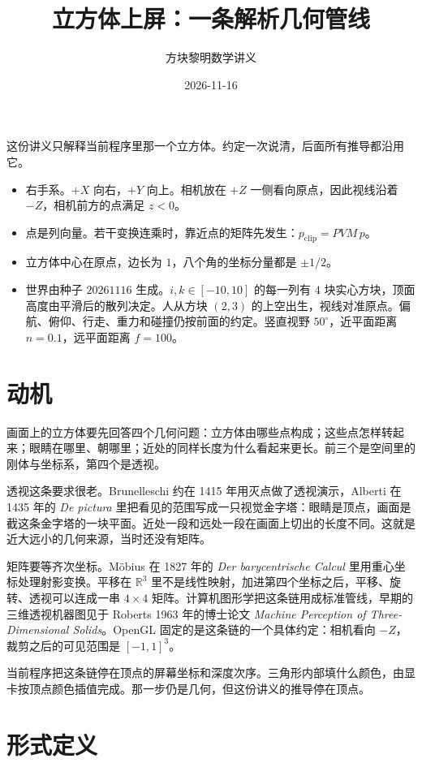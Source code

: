 \documentclass[12pt,a4paper]{article}
\title{立方体上屏：一条解析几何管线}
\author{方块黎明数学讲义}
\date{2026-11-16}
\theoremstyle{definition}
\theoremstyle{plain}
\theoremstyle{remark}
\begin{document}
\maketitle
\tableofcontents
\bigskip

\noindent
这份讲义只解释当前程序里那一个立方体。约定一次说清，后面所有推导都沿用它。

\begin{itemize}
\item 右手系。$+X$ 向右，$+Y$ 向上。相机放在 $+Z$ 一侧看向原点，因此视线沿着 $-Z$，相机前方的点满足 $z<0$。
\item 点是列向量。若干变换连乘时，靠近点的矩阵先发生：$p_{\mathrm{clip}}=PVM\,p$。
\item 立方体中心在原点，边长为 $1$，八个角的坐标分量都是 $\pm 1/2$。
\item 世界由种子 $20261116$ 生成。$i,k\in[-10,10]$ 的每一列有 $4$ 块实心方块，顶面高度由平滑后的散列决定。人从方块 $(2,3)$ 的上空出生，视线对准原点。偏航、俯仰、行走、重力和碰撞仍按前面的约定。竖直视野 $50^\circ$，近平面距离 $n=0.1$，远平面距离 $f=100$。
\end{itemize}

\section{动机}

画面上的立方体要先回答四个几何问题：立方体由哪些点构成；这些点怎样转起来；眼睛在哪里、朝哪里；近处的同样长度为什么看起来更长。前三个是空间里的刚体与坐标系，第四个是透视。

透视这条要求很老。Brunelleschi 约在 1415 年用灭点做了透视演示，Alberti 在 1435 年的 \emph{De pictura} 里把看见的范围写成一只视觉金字塔：眼睛是顶点，画面是截这条金字塔的一块平面。近处一段和远处一段在画面上切出的长度不同。这就是近大远小的几何来源，当时还没有矩阵。

矩阵要等齐次坐标。M\"obius 在 1827 年的 \emph{Der barycentrische Calcul} 里用重心坐标处理射影变换。平移在 $\mathbb{R}^3$ 里不是线性映射，加进第四个坐标之后，平移、旋转、透视可以连成一串 $4\times 4$ 矩阵。计算机图形学把这条链用成标准管线，早期的三维透视机器图见于 Roberts 1963 年的博士论文 \emph{Machine Perception of Three-Dimensional Solids}。OpenGL 固定的是这条链的一个具体约定：相机看向 $-Z$，裁剪之后的可见范围是 $[-1,1]^3$。

当前程序把这条链停在顶点的屏幕坐标和深度次序。三角形内部填什么颜色，由显卡按顶点颜色插值完成。那一步仍是几何，但这份讲义的推导停在顶点。

\section{形式定义}
\end{document}
